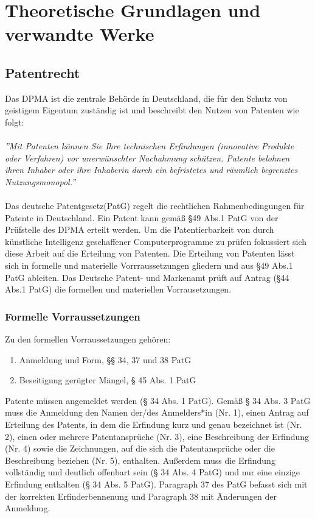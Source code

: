\chapter{Theoretische Grundlagen und verwandte Werke\label{cha:chapter2}}

\section{Patentrecht\label{sec:aaa}}

Das DPMA ist die zentrale Behörde in Deutschland, die für den Schutz von geistigem Eigentum zuständig ist und beschreibt den Nutzen von Patenten wie folgt:
\\
\\
\textit{''Mit Patenten können Sie Ihre technischen Erfindungen (innovative Produkte oder Verfahren) vor unerwünschter Nachahmung schützen. Patente belohnen ihren Inhaber oder ihre Inhaberin durch ein befristetes und räumlich begrenztes Nutzungsmonopol.''} \cite{DPMA}
\cite{Patentschutz}
\\
\\
Das deutsche Patentgesetz(PatG) \cite{PatG} regelt die rechtlichen Rahmenbedingungen für Patente in Deutschland.
Ein Patent kann gemäß §49 Abs.1 PatG von der Prüfstelle des DPMA erteilt werden. Um die Patentierbarkeit von durch künstliche Intelligenz geschaffener Computerprogramme zu prüfen fokussiert sich diese Arbeit auf die Erteilung von Patenten. Die Erteilung von Patenten lässt sich in formelle und materielle Vorrraussetzungen gliedern und aus §49 Abs.1 PatG ableiten. Das Deutsche Patent- und Markenamt prüft auf Antrag (§44 Abs.1 PatG) die formellen und materiellen Vorrausetzungen.

\subsection{Formelle Vorraussetzungen}

Zu den formellen Vorraussetzungen gehören:
\begin{enumerate}
    \item Anmeldung und Form, §§ 34, 37 und 38 PatG 
    \vspace{-0.11in} 
    \item Beseitigung gerügter Mängel, § 45 Abs. 1 PatG
\end{enumerate}

Patente müssen angemeldet werden (§ 34 Abs. 1 PatG). Gemäß § 34 Abs. 3 PatG muss die Anmeldung den Namen der/des Anmelders*in (Nr. 1), einen Antrag auf Erteilung des Patents, in dem die Erfindung kurz und genau bezeichnet ist (Nr. 2), einen oder mehrere Patentansprüche (Nr. 3), eine Beschreibung der Erfindung (Nr. 4) sowie die Zeichnungen, auf die sich die Patentansprüche oder die Beschreibung beziehen (Nr. 5), enthalten. Außerdem muss die Erfindung vollständig und deutlich offenbart sein (§ 34 Abs. 4 PatG) und nur eine einzige Erfindung enthalten (§ 34 Abs. 5 PatG). Paragraph 37 des PatG befasst sich mit der korrekten Erfinderbennenung und Paragraph 38 mit Änderungen der Anmeldung. 
\\

